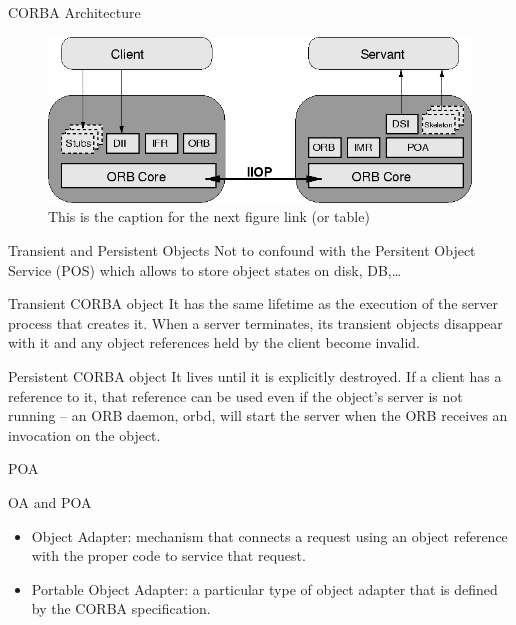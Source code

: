 \documentclass[bigger,hyperref={colorlinks=true, urlcolor=red, plainpages=false, pdfpagelabels, bookmarksnumbered}]{beamer}
\begin{document}
\begin{frame}[label=sec-4-13]{CORBA Architecture}
\begin{figure}[htb]
\centering
\includegraphics[width=.9\linewidth]{img/corba_archi.png}
\caption{This is the caption for the next figure link (or table)}
\end{figure}
\end{frame}
\begin{frame}[label=sec-4-14]{Transient and Persistent Objects}
Not to confound with the Persitent Object Service (POS) which allows to store object states on disk, DB,\ldots{}
\begin{block}{Transient CORBA object}
It has the same lifetime as the execution of the server process that creates it. When a server terminates, its transient objects disappear with it and any object references held by the client become invalid.
\end{block}

\begin{block}{Persistent CORBA object}
It lives until it is explicitly destroyed. If a client has a reference to it, that reference can be used even if the object’s server is not running – an ORB daemon, orbd, will start the server when the ORB receives an invocation on the object.
\end{block}
\end{frame}
\begin{frame}[label=sec-4-15]{POA}
\begin{block}{OA and POA}
\begin{itemize}
\item Object Adapter: 
mechanism that connects a request using an object reference with the proper code to service that request.

\item Portable Object Adapter: a particular type of object adapter that is 
defined by the CORBA specification.
\end{itemize}
\end{block}
\end{frame}
\end{document}
